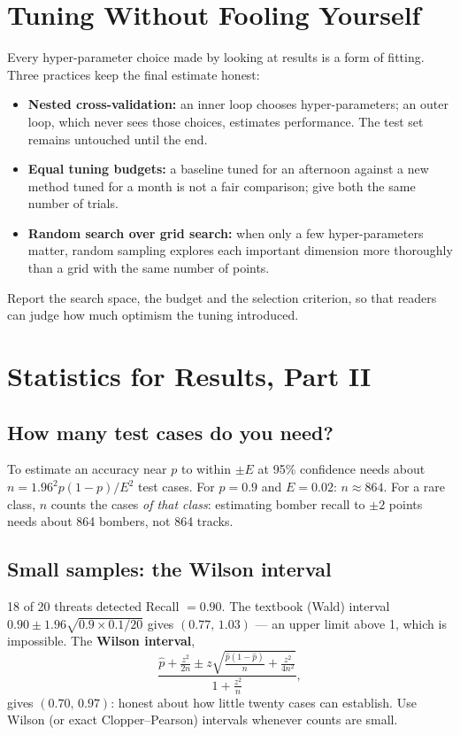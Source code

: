 \documentclass[11pt]{article}
\begin{document}
\section{Tuning Without Fooling Yourself}
Every hyper-parameter choice made by looking at results is a form of fitting. Three practices keep the final estimate honest:
\begin{itemize}
\item \textbf{Nested cross-validation:} an inner loop chooses hyper-parameters; an outer loop, which never sees those choices, estimates performance. The test set remains untouched until the end.
\item \textbf{Equal tuning budgets:} a baseline tuned for an afternoon against a new method tuned for a month is not a fair comparison; give both the same number of trials.
\item \textbf{Random search over grid search:} when only a few hyper-parameters matter, random sampling explores each important dimension more thoroughly than a grid with the same number of points.
\end{itemize}
Report the search space, the budget and the selection criterion, so that readers can judge how much optimism the tuning introduced.

\section{Statistics for Results, Part II}
\subsection{How many test cases do you need?}
To estimate an accuracy near $p$ to within $\pm E$ at 95\% confidence needs about $n=1.96^2p(1-p)/E^2$ test cases. For $p=0.9$ and $E=0.02$: $n\approx864$. For a rare class, $n$ counts the cases \emph{of that class}: estimating bomber recall to $\pm2$ points needs about 864 bombers, not 864 tracks.
\subsection{Small samples: the Wilson interval}
\begin{example}{18 of 20 threats detected}
Recall $=0.90$. The textbook (Wald) interval $0.90\pm1.96\sqrt{0.9\times0.1/20}$ gives $(0.77,\,1.03)$ --- an upper limit above 1, which is impossible. The \textbf{Wilson interval},
\[\frac{\hat p+\frac{z^2}{2n}\pm z\sqrt{\frac{\hat p(1-\hat p)}{n}+\frac{z^2}{4n^2}}}{1+\frac{z^2}{n}},\]
gives $(0.70,\,0.97)$: honest about how little twenty cases can establish. Use Wilson (or exact Clopper--Pearson) intervals whenever counts are small.
\end{example}
\end{document}
